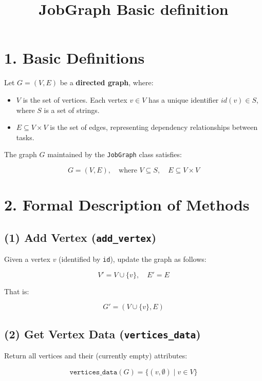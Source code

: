 \documentclass{article}
\title{JobGraph Basic definition}
\author{}
\date{}
\begin{document}
\maketitle

\section*{1. Basic Definitions}

Let $G = (V, E)$ be a \textbf{directed graph}, where:

\begin{itemize}
    \item $V$ is the set of vertices. Each vertex $v \in V$ has a unique identifier $id(v) \in S$, where $S$ is a set of strings.
    \item $E \subseteq V \times V$ is the set of edges, representing dependency relationships between tasks.
\end{itemize}

\bigskip

\noindent
The graph $G$ maintained by the \texttt{JobGraph} class satisfies:

\[
G = (V, E), \quad \text{where } V \subseteq S, \quad E \subseteq V \times V
\]

\section*{2. Formal Description of Methods}

\subsection*{(1) Add Vertex (\texttt{add\_vertex})}

Given a vertex $v$ (identified by \texttt{id}), update the graph as follows:

\[
V' = V \cup \{v\}, \quad E' = E
\]

That is:

\[
G' = (V \cup \{v\}, E)
\]

\subsection*{(2) Get Vertex Data (\texttt{vertices\_data})}

Return all vertices and their (currently empty) attributes:

\[
\texttt{vertices\_data}(G) = \{ (v, \emptyset) \mid v \in V \}
\]
\end{document}

